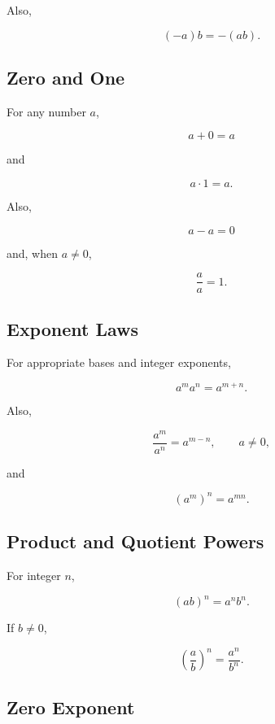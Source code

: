 Also,

\[
\boxed{
(-a)b
=
-(ab).
}
\]

\subsection{Zero and One}
\label{subsec:zero-one-identities}

For any number \(a\),

\[
\boxed{
a+0=a
}
\]

and

\[
\boxed{
a\cdot1=a.
}
\]

Also,

\[
\boxed{
a-a=0
}
\]

and, when \(a\neq0\),

\[
\boxed{
\frac{a}{a}=1.
}
\]

\subsection{Exponent Laws}
\label{subsec:exponent-laws-reference}

For appropriate bases and integer exponents,

\[
\boxed{
a^ma^n
=
a^{m+n}.
}
\]

Also,

\[
\boxed{
\frac{a^m}{a^n}
=
a^{m-n},
\qquad
a\neq0,
}
\]

and

\[
\boxed{
(a^m)^n
=
a^{mn}.
}
\]

\subsection{Product and Quotient Powers}
\label{subsec:product-quotient-powers}

For integer \(n\),

\[
\boxed{
(ab)^n
=
a^nb^n.
}
\]

If \(b\neq0\),

\[
\boxed{
\left(
\frac{a}{b}
\right)^n
=
\frac{a^n}{b^n}.
}
\]

\subsection{Zero Exponent}
\label{subsec:zero-exponent-reference}

